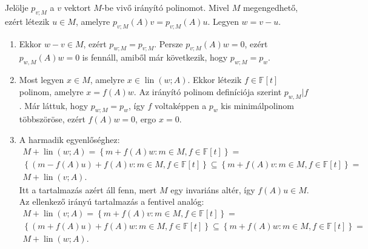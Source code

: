\documentclass[a4paper, showtrims]{memoir}
\makeatletter
\renewenvironment{proof}[1][\proofname]
    {\par\pushQED{\qed}%
    \normalfont \topsep6\p@\@plus6\p@\relax
    \trivlist
    \item[\hskip\labelsep
        \itshape
    #1\@addpunct{:}]\ignorespaces}
    {\popQED\endtrivlist\@endpefalse}
\theoremstyle{plain}
\theoremstyle{remark}
\theoremstyle{definition}
\DeclareMathOperator{\lin}{lin}
\makeatother
\begin{document}
\begin{proof}
    Jelölje $p_{v;M}$ a $v$ vektort $M$-be vivő irányító polinomot.
    Mivel $M$ megengedhető, ezért létezik $u\in M$, amelyre $p_{ v;M}\left( A \right)v=p_{v;M}\left( A \right)u$. 
    Legyen $w=v-u$.
    \begin{enumerate}
        \item 
        Ekkor $w-v\in M$, ezért $p_{w;M}=p_{v;M}$. 
        Persze $p_{v;M}\left( A \right)w=0$,
        ezért $p_{w,M}\left( A \right)w=0$ is fennáll,
        amiből már következik, hogy $p_{w;M}=p_w$.

        \item
        Most legyen $x\in M$, amelyre $x\in\lin\left( w;A \right)$. 
        Ekkor létezik $f\in\mathbb{F}\left[ t \right]$ polinom, amelyre
        \(
            x=f\left( A \right)w.
        \)
        Az irányító polinom definíciója szerint $p_{w,M}|f$.
        Már láttuk, hogy $p_{w;M}=p_w$, így $f$ voltaképpen a $p_w$ kis minimálpolinom többszöröse, 
        ezért $f\left( A \right)w=0$, 
        ergo $x=0$.

        \item
        A harmadik egyenlőséghez:
        \begin{multline*}
            M+\lin\left( w;A \right)
            =
            \left\{ m+f\left( A \right)w:m\in M, f\in\mathbb{F}\left[ t \right] \right\}
            =
            \\
            \left\{ \left( m-f\left( A \right)u \right)+f\left( A \right)v:m\in M, f\in\mathbb{F}\left[ t \right] \right\}
            \subseteq
            \left\{ m+f\left( A \right)v:m\in M, f\in\mathbb{F}\left[ t \right] \right\}
            =
            \\
            M+\lin\left( v;A \right).
        \end{multline*}
        Itt a tartalmazás azért áll fenn, mert $M$ egy invariáns altér, így $f\left( A \right)u\in M$.
        Az ellenkező irányú tartalmazás a fentivel analóg:
        \begin{multline*}
            M+\lin\left( v;A \right)
            =
            \left\{ m+f\left( A \right)v:m\in M, f\in\mathbb{F}\left[ t \right] \right\}
            =
            \\
            \left\{ \left( m+f\left( A \right)u \right)+f\left( A \right)w:m\in M, f\in\mathbb{F}\left[ t \right] \right\}
            \subseteq
            \left\{ m+f\left( A \right)w:m\in M, f\in\mathbb{F}\left[ t \right] \right\}
            =
            \\
            M+\lin\left( w;A \right).
        \end{multline*}
        \qedhere
    \end{enumerate}
\end{proof}
\end{document}

